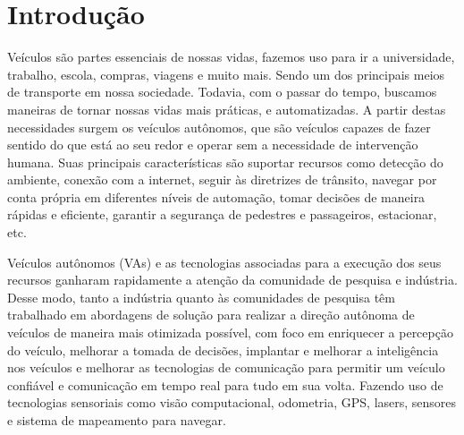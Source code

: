 \documentclass[
	12pt,				%
	openany, %
	a4paper,			%
	english,			%
	french,				%
	spanish,			%
	brazil				%
	]{abntex2}
\let\cleardoublepage\clearpage %
\begin{document}



\tableofcontents*
\cleardoublepage



\textual

\chapter*[Introdução]{Introdução}

Veículos são partes essenciais de nossas vidas, fazemos uso para ir a universidade, trabalho, escola, compras, viagens e muito mais. Sendo um dos principais meios de transporte em nossa sociedade.
Todavia, com o passar do tempo, buscamos maneiras de tornar nossas vidas mais práticas, e automatizadas. A partir destas necessidades surgem os veículos autônomos, que são veículos capazes de fazer sentido do que está ao seu redor e operar sem a necessidade de intervenção humana. Suas principais características são suportar recursos como detecção do ambiente, conexão com a internet, seguir às diretrizes de trânsito, navegar por conta própria em diferentes níveis de automação, tomar decisões de maneira rápidas e eficiente, garantir a segurança de pedestres e passageiros, estacionar, etc.

Veículos autônomos (VAs) e as tecnologias associadas para a execução dos seus recursos ganharam rapidamente a atenção da comunidade de pesquisa e indústria. Desse modo, tanto a indústria quanto às comunidades de pesquisa têm trabalhado em abordagens de solução para realizar a direção autônoma de veículos de maneira mais otimizada possível, com foco em enriquecer a percepção do veículo, melhorar a tomada de decisões, implantar e melhorar a inteligência nos veículos e melhorar as tecnologias de comunicação para permitir um veículo confiável e comunicação em tempo real para tudo em sua volta. Fazendo uso de tecnologias sensoriais como visão computacional, odometria, GPS, lasers, sensores e sistema de mapeamento para navegar.
\end{document}
